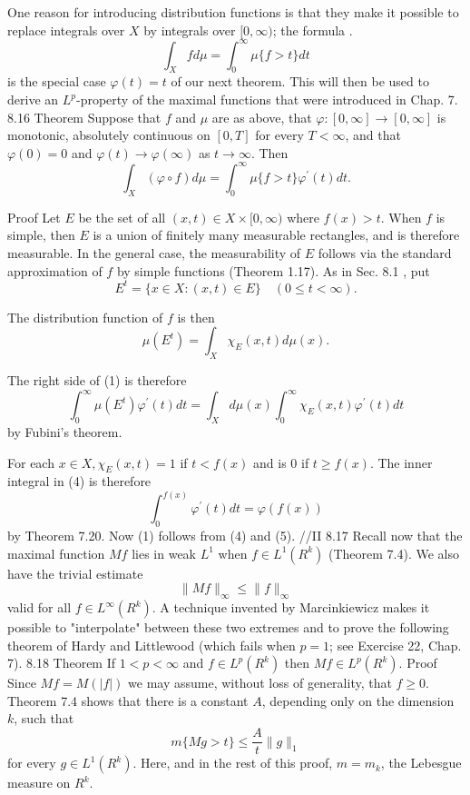 One reason for introducing distribution functions is that they make it possible to replace integrals over $X$ by integrals over $[0, \infty)$; the formula .
$$
\int_X f d \mu=\int_0^{\infty} \mu\{f>t\} d t
$$
is the special case $\varphi(t)=t$ of our next theorem. This will then be used to derive an $L^p$-property of the maximal functions that were introduced in Chap. 7.
8.16 Theorem Suppose that $f$ and $\mu$ are as above, that $\varphi:[0, \infty] \rightarrow[0, \infty]$ is monotonic, absolutely continuous on $[0, T]$ for every $T<\infty$, and that $\varphi(0)=0$ and $\varphi(t) \rightarrow \varphi(\infty)$ as $t \rightarrow \infty$. Then
$$
\int_X(\varphi \circ f) d \mu=\int_0^{\infty} \mu\{f>t\} \varphi^{\prime}(t) d t .
$$

Proof Let $E$ be the set of all $(x, t) \in X \times[0, \infty)$ where $f(x)>t$. When $f$ is simple, then $E$ is a union of finitely many measurable rectangles, and is therefore measurable. In the general case, the measurability of $E$ follows via the standard approximation of $f$ by simple functions (Theorem 1.17). As in Sec. 8.1 , put
$$
E^t=\{x \in X:(x, t) \in E\} \quad(0 \leq t<\infty) .
$$

The distribution function of $f$ is then
$$
\mu\left(E^t\right)=\int_X \chi_E(x, t) d \mu(x) .
$$

The right side of (1) is therefore
$$
\int_0^{\infty} \mu\left(E^t\right) \varphi^{\prime}(t) d t=\int_X d \mu(x) \int_0^{\infty} \chi_E(x, t) \varphi^{\prime}(t) d t
$$
by Fubini's theorem.

For each $x \in X, \chi_E(x, t)=1$ if $t<f(x)$ and is 0 if $t \geq f(x)$. The inner integral in (4) is therefore
$$
\int_0^{f(x)} \varphi^{\prime}(t) d t=\varphi(f(x))
$$
by Theorem 7.20. Now (1) follows from (4) and (5).
//II
8.17 Recall now that the maximal function $M f$ lies in weak $L^1$ when $f \in L^1\left(R^k\right)$ (Theorem 7.4). We also have the trivial estimate
$$
\|M f\|_{\infty} \leq\|f\|_{\infty}
$$
valid for all $f \in L^{\infty}\left(R^k\right)$. A technique invented by Marcinkiewicz makes it possible to "interpolate" between these two extremes and to prove the following theorem of Hardy and Littlewood (which fails when $p=1$; see Exercise 22, Chap. 7).
8.18 Theorem If $1<p<\infty$ and $f \in L^p\left(R^k\right)$ then $M f \in L^p\left(R^k\right)$.
Proof Since $M f=M(|f|)$ we may assume, without loss of generality, that $f \geq 0$. Theorem 7.4 shows that there is a constant $A$, depending only on the dimension $k$, such that
$$
m\{M g>t\} \leq \frac{A}{t}\|g\|_1
$$
for every $g \in L^1\left(R^k\right)$. Here, and in the rest of this proof, $m=m_k$, the Lebesgue measure on $R^k$.

